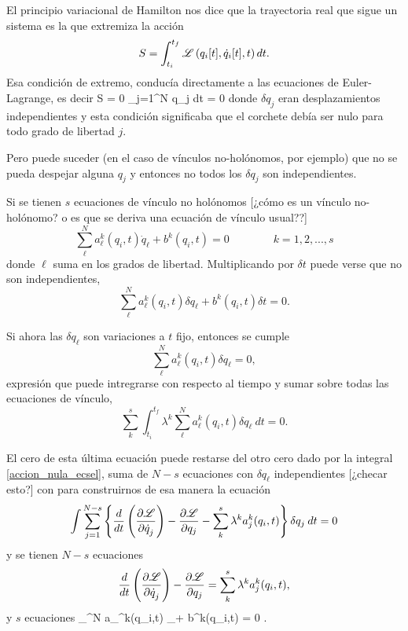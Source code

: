 \documentclass[10pt,oneside]{CBFT_book}
\begin{document}
El principio variacional de Hamilton nos dice que la trayectoria real que sigue un sistema es la que 
extremiza la acción
\[
	S = \int_{t_i}^{t_f} \mathscr{L} \left( q_i[t], \dot{q}_i[t], t \right) dt.
\]
Esa condición de extremo, conducía directamente a las ecuaciones de Euler-Lagrange, es decir
\be
	\delta S = 0 \quad \Leftrightarrow \quad \int \sum_{j=1}^{N} 
	\delta q_j \: dt = 0
	\label{accion_nula_ecsel}
\ee
donde $\delta q_j$ eran desplazamientos independientes y esta condición significaba que el corchete debía
ser nulo para todo grado de libertad $j$.

Pero puede suceder (en el caso de vínculos no-holónomos, por ejemplo) que no se pueda despejar alguna $ q_j $ y 
entonces no todos los  $\delta q_j$ son independientes.

Si se tienen $s$ ecuaciones de vínculo no holónomos [¿cómo es un vínculo no-holónomo? o es que se deriva una
ecuación de vínculo usual??]
\[
	\sum_{\ell}^N a_\ell^k(q_i,t) \dot{q}_\ell + b^k(q_i,t) = 0 \qquad \qquad k=1,2,...,s
\]
donde $\ell$ suma en los grados de libertad.
Multiplicando por $\delta t$ puede verse que no son independientes,
\[
	\sum_{\ell}^N a_\ell^k(q_i,t) \delta {q}_\ell + b^k(q_i,t) \delta t= 0 .
\]

Si ahora las $\delta q_\ell$ son variaciones a $t$ fijo, entonces se cumple 
\[
	\sum_{\ell}^N a_\ell^k(q_i,t) \delta {q}_\ell = 0,
\]
expresión que puede intregrarse con respecto al tiempo y sumar sobre todas las ecuaciones de vínculo,
\[
	\sum_{k}^s \int_{t_i}^{t_f} \lambda^k \sum_{\ell}^N a_\ell^k(q_i,t) \delta {q}_\ell \: dt = 0.
\]

El cero de esta última ecuación puede restarse del otro cero dado por la integral \eqref{accion_nula_ecsel},
suma de $N-s$ ecuaciones con $\delta q_\ell$ independientes [¿checar esto?] con para construirnos de esa manera la ecuación
\[
	\int \sum_{j=1}^{N-s} \left\{ \frac{d}{dt}\left( \frac{\partial^{\hspace{-0.05em}} {\mathscr{L}}}{\partial {\dot{q}_j}^{\hspace{-0.05em}}} \right) -\frac{\partial^{\hspace{-0.05em}} {\mathscr{L}}}{\partial {q_j}^{\hspace{-0.05em}}}
	- \sum_{k}^s \lambda^k a_j^k(q_i,t) \right\} \delta {q}_j \: dt = 0
\]
y se tienen $N-s$ ecuaciones
\[
	\frac{d}{dt}\left( \frac{\partial^{\hspace{-0.05em}} {\mathscr{L}}}{\partial {\dot{q}_j}^{\hspace{-0.05em}}} \right) -\frac{\partial^{\hspace{-0.05em}} {\mathscr{L}}}{\partial {q_j}^{\hspace{-0.05em}}} =  \sum_{k}^s \lambda^k a_j^k(q_i,t),
\]
y $s$ ecuaciones 
\be
	\sum_{\ell}^N a_\ell^k(q_i,t) _\ell + b^k(q_i,t) = 0 .
	\label{ecs_vinculo}
\ee
\end{document}
